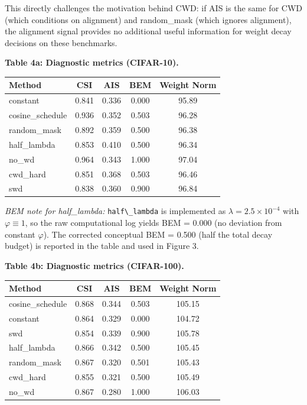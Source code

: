\documentclass[
]{article}
\begin{document}
This directly challenges the motivation behind CWD: if AIS is the same
for CWD (which conditions on alignment) and random\_mask (which ignores
alignment), the alignment signal provides no additional useful
information for weight decay decisions on these benchmarks.

\textbf{Table 4a: Diagnostic metrics (CIFAR-10).}

\begin{longtable}[]{@{}lcccc@{}}
\toprule\noalign{}
Method & CSI & AIS & BEM & Weight Norm \\
\midrule\noalign{}
\endhead
\bottomrule\noalign{}
\endlastfoot
constant & 0.841 & 0.336 & 0.000 & 95.89 \\
cosine\_schedule & 0.936 & 0.352 & 0.503 & 96.28 \\
random\_mask & 0.892 & 0.359 & 0.500 & 96.38 \\
half\_lambda & 0.853 & 0.410 & 0.500 & 96.34 \\
no\_wd & 0.964 & 0.343 & 1.000 & 97.04 \\
cwd\_hard & 0.851 & 0.368 & 0.503 & 96.46 \\
swd & 0.838 & 0.360 & 0.900 & 96.84 \\
\end{longtable}

\emph{BEM note for half\_lambda:} \texttt{half\textbackslash{}\_lambda}
is implemented as \(\lambda = 2.5 \times 10^{-4}\) with
\(\varphi \equiv 1\), so the raw computational log yields BEM = 0.000
(no deviation from constant \(\varphi\)). The corrected conceptual BEM =
0.500 (half the total decay budget) is reported in the table and used in
Figure 3.

\textbf{Table 4b: Diagnostic metrics (CIFAR-100).}

\begin{longtable}[]{@{}lcccc@{}}
\toprule\noalign{}
Method & CSI & AIS & BEM & Weight Norm \\
\midrule\noalign{}
\endhead
\bottomrule\noalign{}
\endlastfoot
cosine\_schedule & 0.868 & 0.344 & 0.503 & 105.15 \\
constant & 0.864 & 0.329 & 0.000 & 104.72 \\
swd & 0.854 & 0.339 & 0.900 & 105.78 \\
half\_lambda & 0.866 & 0.342 & 0.500 & 105.45 \\
random\_mask & 0.867 & 0.320 & 0.501 & 105.43 \\
cwd\_hard & 0.855 & 0.321 & 0.500 & 105.49 \\
no\_wd & 0.867 & 0.280 & 1.000 & 106.03 \\
\end{longtable}
\end{document}
